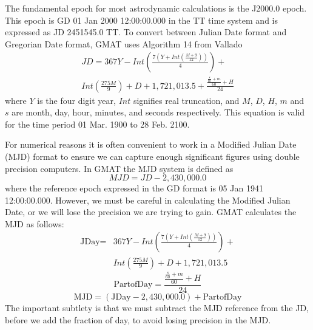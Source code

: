 The fundamental epoch for most astrodynamic calculations is the
J2000.0 epoch\cite{seidelmann}.  This epoch is GD 01 Jan 2000
12:00:00.000 in the TT time system and is expressed as JD 2451545.0
TT. To convert between Julian Date format and Gregorian Date format,
GMAT uses Algorithm 14 from Vallado\cite{vallado2}
%
\begin{equation}
\begin{split}
    JD = 367Y - Int\left( \displaystyle\frac{ 7\left( Y + Int\left( \displaystyle\frac{M + 9}{12} \right) \right)}{4}
    \right)+ \\Int\left(\displaystyle\frac{275M}{9} \right) + D +
    1,721,013.5 + \frac{ \displaystyle\frac{ \displaystyle\frac{s}{60}+m}{60} + H}{24}
    \end{split}
\end{equation}
%
where $Y$ is the four digit year, $Int$ signifies real truncation,
and $M$, $D$, $H$, $m$ and $s$ are month, day, hour, minutes, and
seconds respectively. This equation is valid for the time period 01
Mar. 1900 to 28 Feb. 2100.

For numerical reasons it is often convenient to work in a Modified
Julian Date (MJD) format to ensure we can capture enough significant
figures using double precision computers.  In GMAT the MJD system is
defined as
%
\begin{equation}
     MJD = JD - 2,430,000.0
\end{equation}
%
where the reference epoch expressed in the GD format is 05 Jan 1941
12:00:00.000.  However, we must be careful in calculating the
Modified Julian Date, or we will lose the precision we are trying to
gain.  GMAT calculates the MJD as follows:
%
\begin{equation}
     \begin{split}
     \mbox{JDay} = & 367Y - Int\left( \displaystyle\frac{ 7\left( Y + Int\left( \displaystyle\frac{M + 9}{12} \right) \right)}{4}
    \right)+ \\ & Int\left(\displaystyle\frac{275M}{9} \right) + D +
    1,721,013.5
    \end{split}
\end{equation}
%
\begin{equation}
     \mbox{PartofDay} = \frac{ \displaystyle\frac{ \displaystyle\frac{s}{60}+m}{60} + H}{24}
\end{equation}
%
\begin{equation}
     \mbox{MJD} = (\mbox{JDay}- 2,430,000.0) + \mbox{PartofDay}
\end{equation}
%
The important subtlety is that we must subtract the MJD reference
from the JD, before we add the fraction of day, to avoid losing
precision in the MJD.

